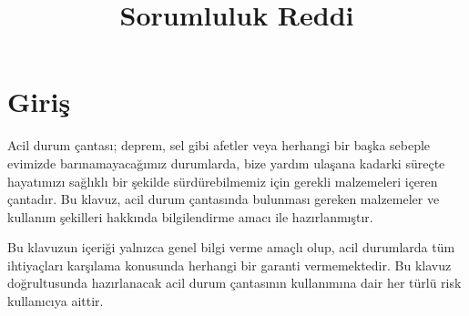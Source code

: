 \chapter*{Giriş}

Acil durum çantası; deprem, sel gibi afetler veya herhangi bir başka sebeple evimizde barınamayacağımız durumlarda, bize yardım ulaşana kadarki süreçte hayatımızı sağlıklı bir şekilde sürdürebilmemiz için gerekli malzemeleri içeren çantadır. Bu klavuz, acil durum çantasında bulunması gereken malzemeler ve kullanım şekilleri hakkında bilgilendirme amacı ile hazırlanmıştır.

\vspace{2ex}
\title{\textbf{Sorumluluk Reddi}}

Bu klavuzun içeriği yalnızca genel bilgi verme amaçlı olup, acil durumlarda tüm ihtiyaçları karşılama konusunda herhangi bir garanti vermemektedir. Bu klavuz doğrultusunda hazırlanacak acil durum çantasının kullanımına dair her türlü risk kullanıcıya aittir.
